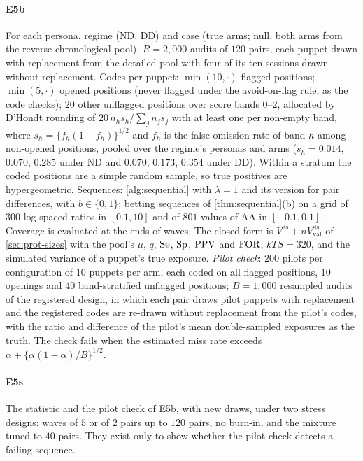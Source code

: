 \paragraph{E5b} For each persona, regime (ND, DD) and case (true arms; null, both arms from the reverse-chronological pool), $R=2{,}000$ audits of $120$ pairs, each puppet drawn with replacement from the detailed pool with four of its ten sessions drawn without replacement. Codes per puppet: $\min(10,\cdot)$ flagged positions; $\min(5,\cdot)$ opened positions (never flagged under the avoid-on-flag rule, as the code checks); $20$ other unflagged positions over score bands $0$--$2$, allocated by D'Hondt rounding of $20\,n_hs_h/\sum_jn_js_j$ with at least one per non-empty band, where $s_h=\{f_h(1-f_h)\}^{1/2}$ and $f_h$ is the false-omission rate of band $h$ among non-opened positions, pooled over the regime's personas and arms ($s_h=0.014$, $0.070$, $0.285$ under ND and $0.070$, $0.173$, $0.354$ under DD). Within a stratum the coded positions are a simple random sample, so true positives are hypergeometric. Sequences: \cref{alg:sequential} with $\lambda=1$ and its version for pair differences, with $b\in\{0,1\}$; betting sequences of \cref{thm:sequential}(b) on a grid of $300$ log-spaced ratios in $[0.1,10]$ and of $801$ values of $\mathrm{AA}$ in $[-0.1,0.1]$. Coverage is evaluated at the ends of waves. The closed form is $V^{\mathrm{ds}}+nV^{\mathrm{ds}}_{\mathrm{val}}$ of \cref{sec:prot-sizes} with the pool's $\mu$, $q$, $\mathrm{Se}$, $\mathrm{Sp}$, $\mathrm{PPV}$ and $\mathrm{FOR}$, $kTS=320$, and the simulated variance of a puppet's true exposure. \emph{Pilot check}: $200$ pilots per configuration of $10$ puppets per arm, each coded on all flagged positions, $10$ openings and $40$ band-stratified unflagged positions; $B=1{,}000$ resampled audits of the registered design, in which each pair draws pilot puppets with replacement and the registered codes are re-drawn without replacement from the pilot's codes, with the ratio and difference of the pilot's mean double-sampled exposures as the truth. The check fails when the estimated miss rate exceeds $\alpha+\{\alpha(1-\alpha)/B\}^{1/2}$.

\paragraph{E5s} The statistic and the pilot check of E5b, with new draws, under two stress designs: waves of $5$ or of $2$ pairs up to $120$ pairs, no burn-in, and the mixture tuned to $40$ pairs. They exist only to show whether the pilot check detects a failing sequence.

